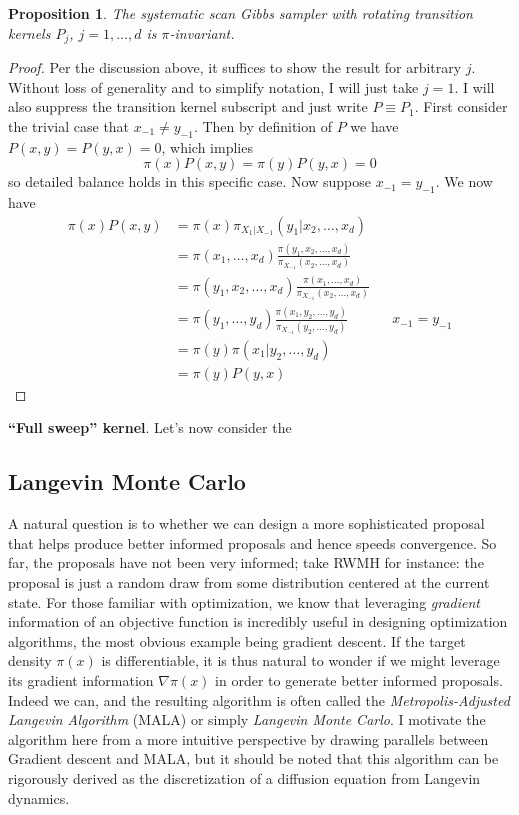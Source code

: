 \documentclass[12pt]{article}
\newtheorem{prop}{Proposition}
\begin{document}
\begin{prop}
The systematic scan Gibbs sampler with rotating transition kernels $P_j$, $j = 1, \dots, d$ is $\pi$-invariant. 
\end{prop}

\begin{proof}
Per the discussion above, it suffices to show the result for arbitrary $j$. Without loss of generality and to simplify notation, I will just take $j = 1$. I will also suppress the transition kernel subscript 
and just write $P \equiv P_1$. 
First consider the trivial case that $x_{-1} \neq y_{-1}$. Then by definition of $P$ we have $P(x, y) = P(y, x) = 0$, which implies
\[\pi(x)P(x, y) = \pi(y)P(y, x) = 0\]
so detailed balance holds in this specific case. Now suppose $x_{-1} = y_{-1}$. We now have 
\begin{align*}
\pi(x)P(x, y) &= \pi(x)\pi_{X_1|X_{-1}}(y_1|x_2, \dots, x_d) \\
			 &= \pi(x_1, \dots, x_d) \frac{\pi(y_1, x_2, \dots, x_d)}{\pi_{X_{-1}}(x_2, \dots, x_d)} \\
			 &= \pi(y_1, x_2, \dots, x_d) \frac{\pi(x_1, \dots, x_d)}{\pi_{X_{-1}}(x_2, \dots, x_d)} \\
			 &= \pi(y_1, \dots, y_d) \frac{\pi(x_1, y_2, \dots, y_d)}{\pi_{X_{-1}}(y_2, \dots, y_d)} && x_{-1} = y_{-1}\\
			 &= \pi(y) \pi(x_1|y_2, \dots, y_d) \\
			 &= \pi(y) P(y, x)
\end{align*}
\end{proof}

\textbf{``Full sweep'' kernel}. Let's now consider the 



\subsection{Langevin Monte Carlo} 
A natural question is to whether we can design a more sophisticated proposal that helps produce better informed proposals and 
hence speeds convergence. So far, the proposals have not been very informed; take RWMH for instance: the proposal is just a random draw from some distribution 
centered at the current state. For those familiar with optimization, we know that leveraging \textit{gradient} information of an objective function is incredibly 
useful in designing optimization algorithms, the most obvious example being gradient descent. If the target density $\pi(x)$ is differentiable, it is thus natural to wonder if we 
might leverage its gradient information $\nabla \pi(x)$ in order to generate better informed proposals. Indeed we can, and the resulting algorithm is often called the
\textit{Metropolis-Adjusted Langevin Algorithm} (MALA) or simply \textit{Langevin Monte Carlo}. I motivate the algorithm here from a more intuitive perspective by drawing
parallels between Gradient descent and MALA, but it should be noted that this algorithm can be rigorously derived as the discretization of a diffusion equation from
Langevin dynamics. 
\end{document}
